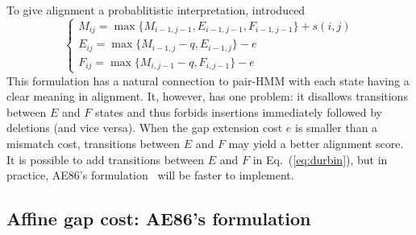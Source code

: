 \documentclass{bioinfo}
\begin{document}
To give alignment a probablitistic interpretation, \citep{Durbin:1998uq} 
introduced
\begin{equation}\label{eq:durbin}
\left\{\begin{array}{l}
M_{ij}=\max\{M_{i-1,j-1}, E_{i-1,j-1}, F_{i-1,j-1}\} + s(i,j)\\
E_{ij}=\max\{M_{i-1,j}-q, E_{i-1,j}\} - e\\
F_{ij}=\max\{M_{i,j-1}-q, F_{i,j-1}\} - e
\end{array}\right.
\end{equation}
This formulation has a natural connection to pair-HMM with each state having a
clear meaning in alignment. It, however, has one problem: it disallows
transitions between $E$ and $F$ states and thus forbids insertions immediately
followed by deletions (and vice versa). When the gap extension cost $e$ is
smaller than a mismatch cost, transitions between $E$ and $F$ may yield a
better alignment score. It is possible to add transitions between $E$ and $F$
in Eq.~(\ref{eq:durbin}), but in practice, AE86's
formulation~\citep{Altschul:1986aa} will be faster to implement.

\subsection{Affine gap cost: AE86's formulation}
\end{document}
